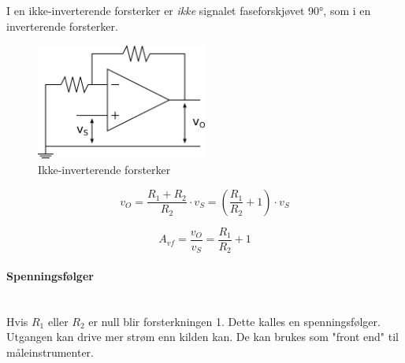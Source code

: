 I en ikke-inverterende forsterker er \emph{ikke} signalet faseforskjøvet 90°,
som i en inverterende forsterker.

\begin{figure}[H]
  \caption{Ikke-inverterende forsterker}
  \centering
  \includegraphics[width=0.5\textwidth]{./img/ikkeinv}
\end{figure}

$$v_O = \frac{R_1+R_2}{R_2} \cdot v_S
= \left( \frac{R_1}{R_2} + 1 \right) \cdot v_S$$

$$A_{vf} = \frac{v_O}{v_S} = \frac{R_1}{R_2}+1$$



\paragraph{Spenningsfølger} \mbox{} \\
Hvis $R_1$ eller $R_2$ er null blir forsterkningen 1.
Dette kalles en spenningsfølger.
Utgangen kan drive mer strøm enn kilden kan.
De kan brukes som "front end" til måleinstrumenter.
